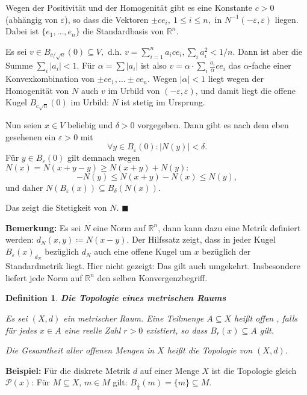 \documentclass[12pt]{scrbook}   %
\newtheorem{definiX}[alles]{Definition}
\newenvironment{defini}[1]{\begin{definiX}{\bf #1}\par\rm}{\end{definiX}}
\newcommand{\qed}{\phantom{.}\hfill{$\blacksquare$}}
\newcommand{\da}{\coloneqq}
\begin{document}
Wegen der Positivität und der Homogenität gibt es eine Konstante $c>0$ 
(abhän\-gig von $\varepsilon$), so dass die Vektoren 
$\pm c e_i,\ 1\leq i\leq n,$
in $N^{-1}(-\varepsilon , \varepsilon)$ liegen. Dabei ist $\{e_1,\dots ,e_n\}$ 
die Standardbasis von $\mathbb R^n.$

Es sei $v\in B_{c/\sqrt n}(0)\subseteq V,$ d.h. $v= \sum_{i=1}^n a_i c e_i, 
\sum_i a_i^2 < 1/n.$ Dann ist aber die Summe $\sum_i|a_i| < 1.$ Für
$\alpha = \sum |a_i|$ ist also $v=\alpha\cdot \sum_i \frac{a_i}{\alpha}
ce_i$ das $\alpha$-fache einer Konvexkombination 
von $\pm ce_1,\dots \pm ce_n.$ Wegen  $|\alpha|<1$ liegt wegen der 
Homogenität von $N$ auch $v$ im Urbild von $(-\varepsilon, \varepsilon)$, und
damit liegt die offene Kugel $B_{c\sqrt n}(0)$ im Urbild: $N$ ist stetig im 
Ursprung. 

Nun seien $x\in V$ beliebig und $\delta>0$ vorgegeben. Dann gibt es nach dem 
eben gesehenen ein $\varepsilon>0$ mit 
$$\forall y\in B_\varepsilon (0) : |N(y)| < \delta.$$
Für $y\in B_\varepsilon (0)$ gilt demnach wegen
$N(x) = N(x+y-y)\geq N(x+y) + N(y):$
$$-N(y) \leq  N(x+y) - N(x) \leq N(y),$$
und daher $N(B_\varepsilon(x)) \subseteq B_\delta(N(x)).$ 
\nopagebreak

Das zeigt die Stetigkeit von $N.$ \qed

{\bf Bemerkung:} Es sei $N$ eine Norm auf $\mathbb R^n$, dann kann dazu eine Metrik definiert werden: $d_N(x,y) \da N(x-y)$. Der Hilfssatz zeigt, dass in jeder Kugel $B_\varepsilon(x)_{d_N}$ bezüglich $d_N$ auch eine offene Kugel um $x$ bezüglich der Standardmetrik liegt. Hier nicht gezeigt: Das gilt auch umgekehrt. Insbesondere liefert jede Norm auf $\mathbb R^n$ den selben Konvergenzbegriff.

\begin{defini}{Die Topologie eines metrischen Raums}
Es sei $(X,d)$ ein metrischer Raum. Eine Teilmenge $A\subseteq X$ heißt
{\it offen} , falls für jedes $x\in A$ eine reelle Zahl $r>0$
existiert, so dass $B_r(x)\subseteq A$ gilt. 

Die Gesamtheit aller offenen Mengen in $X$ heißt die {\it Topologie} von 
$(X,d).$
\end{defini}

{\bf Beispiel:} Für die diskrete Metrik $d$ auf einer Menge $X$ ist die Topologie gleich $\mathcal P(x)$: Für $M\subseteq X$, $m\in M$ gilt: $B_{\frac{1}{2}}(m) = \{m\} \subseteq M$.
\end{document}
